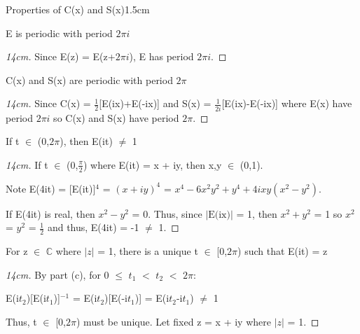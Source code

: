    \begin{ltheorem}{Properties of C(x) and S(x)}{1.5cm}
        \item E is periodic with period $2\pi i$
        
            \begin{proof}[14cm]
                Since E(z) = E(z+$2\pi i$), E has period $2\pi i$.
            \end{proof}
        
        \item C(x) and S(x) are periodic with period $2\pi$
        
            \begin{proof}[14cm]
                Since C(x) = $\frac{1}{2}$[E(ix)+E(-ix)] and
                S(x) = $\frac{1}{2i}$[E(ix)-E(-ix)] where E(x)
                have period $2\pi i$ so C(x) and S(x) have period $2\pi$.
            \end{proof}
        
        \item If t $\in$ (0,$2\pi$), then E(it) $\not =$ 1
        
            \begin{proof}[14cm]
                If t $\in$ (0,$\frac{\pi}{2}$) where E(it) = x + iy,
                then x,y $\in$ (0,1).

                Note E(4it) = [E(it)]$^4$ = $(x+iy)^4$
                = $x^4 - 6x^2y^2 + y^4 + 4ixy(x^2 - y^2)$.

                If E(4it) is real, then $x^2 - y^2$ = 0.
                Thus, since $|\text{E(ix)}|$ = 1, then $x^2 + y^2$ = 1
                so $x^2$ = $y^2$ = $\frac{1}{2}$ and thus,
                E(4it) = -1 $\not =$ 1.
            \end{proof}

            \newpage
        
        \item For z $\in$ $\mathbb{C}$ where $|z|$ = 1,
            there is a unique t $\in$ [0,$2\pi$) such that E(it) = z

            \begin{proof}[14cm]
                By part (c), for 0 $\leq$ $t_1$ $<$ $t_2$ $<$ $2\pi$:
                
                \hspace{0.5cm}
                E(i$t_2$)[E(i$t_1$)]$^{-1}$
                = E(i$t_2$)[E(-i$t_1$)] = E(i$t_2$-i$t_1$) $\not =$ 1

                Thus, t $\in$ [0,$2\pi$) must be unique.
                Let fixed z = x + iy where $|z|$ = 1.


\end{proof}
\end{ltheorem}
